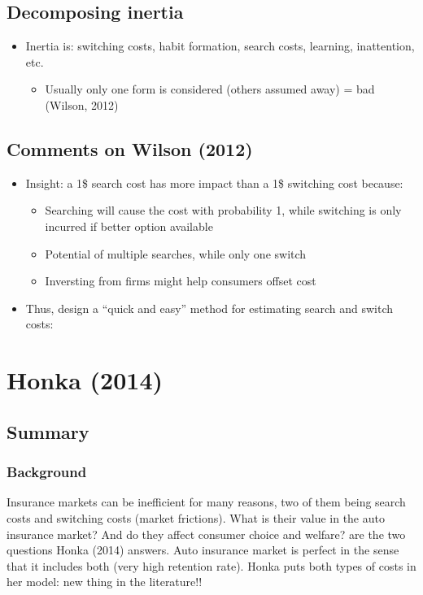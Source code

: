 \subsection{Decomposing inertia}

\begin{itemize}
\item Inertia is: switching costs, habit formation, search costs, learning, inattention, etc.
\begin{itemize}
\item Usually only one form is considered (others assumed away) = bad (Wilson, 2012)
\end{itemize}
\end{itemize}

\subsection{Comments on Wilson (2012)}

\begin{itemize}
\item Insight: a 1\$ search cost has more impact than a 1\$ switching cost because:
\begin{itemize}
\item Searching will cause the cost with probability 1, while switching is only incurred if better option available
\item Potential of multiple searches, while only one switch
\item Inversting from firms might help consumers offset cost
\end{itemize}
\item Thus, design a ``quick and easy'' method for estimating search and switch costs:
\end{itemize}

\section{Honka (2014)}

\subsection{Summary}

\subsubsection{Background}

Insurance markets can be inefficient for many reasons, two of them being search costs and switching costs (market frictions). What is their value in the auto insurance market? And do they affect consumer choice and welfare? are the two questions Honka (2014) answers. Auto insurance market is perfect in the sense that it includes both (very high retention rate). Honka puts both types of costs in her model: new thing in the literature!!

